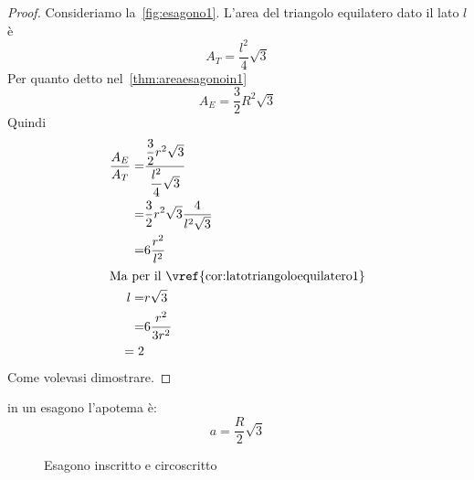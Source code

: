 \begin{proof}
	Consideriamo la~\vref{fig:esagono1}. L'area del triangolo equilatero dato il lato $l$ è \[A_T=\dfrac{l^2}{4}\sqrt{3}\]
	Per quanto detto nel~\vref{thm:areaesagonoin1}
	\[A_E=\dfrac{3}{2}R^2\sqrt{3}\]
	Quindi
	\begin{align*}
		\dfrac{A_E}{A_T}=&\dfrac{\dfrac{3}{2}r^2\sqrt{3}}{\dfrac{l^2}{4}\sqrt{3}}\\
		=&\dfrac{3}{2}r^2\sqrt{3}\dfrac{4}{l^2\sqrt{3}}\\
		=&6\dfrac{r^2}{l^2}\\
		\intertext{Ma per il~\vref{cor:latotriangoloequilatero1}}
		l=&r\sqrt{3}\\
		=&6\dfrac{r^2}{3r^2}\\
		=2
	\end{align*}
	Come volevasi dimostrare.
\end{proof}
\begin{thm}
	in un esagono l'apotema è:\[a=\dfrac{R}{2}\sqrt{3} \]
\end{thm}
\begin{figure}
	\centering
	
	\caption{Esagono inscritto e circoscritto}
	\label{fig:esagonoinscrittocircoscritto}
\end{figure}
